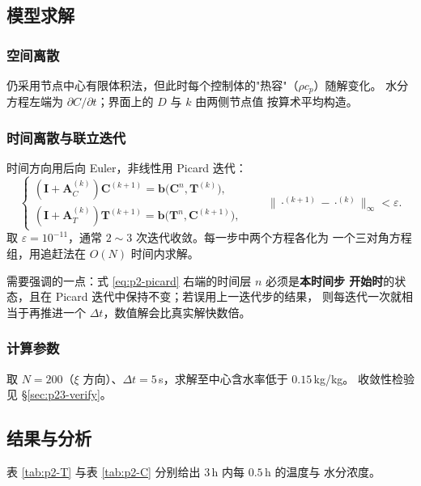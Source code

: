 \documentclass[12pt,a4paper]{ctexart}
\begin{document}
\subsection{模型求解}

\subsubsection{空间离散}

仍采用节点中心有限体积法，但此时每个控制体的"热容"（$\rho c_p$）随解变化。
水分方程左端为 $\partial C/\partial t$；界面上的 $D$ 与 $k$ 由两侧节点值
按算术平均构造。

\subsubsection{时间离散与联立迭代}

时间方向用后向 Euler，非线性用 Picard 迭代：
\begin{equation}
  \begin{cases}
    \left(\bm{I}+\bm{A}_C^{(k)}\right)\bm{C}^{(k+1)}
      =\bm{b}\big(\bm{C}^{n},\bm{T}^{(k)}\big),\\[3pt]
    \left(\bm{I}+\bm{A}_T^{(k)}\right)\bm{T}^{(k+1)}
      =\bm{b}\big(\bm{T}^{n},\bm{C}^{(k+1)}\big),
  \end{cases}
  \qquad
  \big\|\cdot^{(k+1)}-\cdot^{(k)}\big\|_\infty<\varepsilon .
  \label{eq:p2-picard}
\end{equation}
取 $\varepsilon=10^{-11}$，通常 $2\sim3$ 次迭代收敛。每一步中两个方程各化为
一个三对角方程组，用追赶法在 $O(N)$ 时间内求解。

需要强调的一点：式 \eqref{eq:p2-picard} 右端的时间层 $n$ 必须是\textbf{本时间步
开始时}的状态，且在 Picard 迭代中保持不变；若误用上一迭代步的结果，
则每迭代一次就相当于再推进一个 $\Delta t$，数值解会比真实解快数倍。

\subsubsection{计算参数}

取 $N=200$（$\xi$ 方向）、$\Delta t=5$\,s，求解至中心含水率低于 $0.15$\,kg/kg。
收敛性检验见 §\ref{sec:p23-verify}。

\subsection{结果与分析}

表 \ref{tab:p2-T} 与表 \ref{tab:p2-C} 分别给出 3\,h 内每 $0.5$\,h 的温度与
水分浓度。
\end{document}
